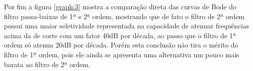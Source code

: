 Por fim a figura \ref{graph:3} mostra a comparação direta das curvas de Bode do filtro passa-baixas de 1ª e 2ª ordem, mostrando que de fato o filtro de 2ª ordem possui uma maior seletividade representada na capacidade de atenuar frequências acima da de corte com um fator 40dB por década, ao passo que o filtro de 1ª ordem só atenua 20dB por década. Porém esta conclusão não tira o mérito do filtro de 1ª ordem, pois ele ainda se apresenta uma alternativa um pouco mais barata ao filtro de 2ª ordem.




